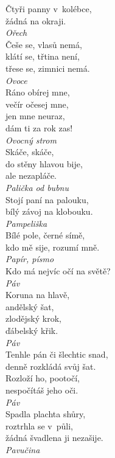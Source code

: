 \begin{multicols}{4}
\noindent
Čtyři panny v~kolébce,\\
žádná na okraji.\\[1 mm]
{\sl Ořech}\\

\noindent
Češe se, vlasů nemá,\\
klátí se, třtina není,\\
třese se, zimnici nemá.\\[1 mm]
{\sl Ovoce}\\

\noindent
Ráno obírej mne,\\
večír očesej mne,\\
jen mne neuraz,\\
dám ti za rok zas!\\[1 mm]
{\sl Ovocný strom}\\

\noindent
Skáče, skáče,\\
do stěny hlavou bije,\\
ale nezapláče.\\[1 mm]
{\sl Palička od bubnu}\\

\noindent
Stojí paní na palouku,\\
bílý závoj na klobouku.\\[1 mm]
{\sl Pampeliška}\\

\noindent
Bílé pole, černé símě,\\
kdo mě sije, rozumí mně.\\[1 mm]
{\sl Papír, písmo}\\

\noindent
Kdo má nejvíc očí na světě?\\[1 mm]
{\sl Páv}\\

\noindent
Koruna na hlavě,\\
andělský šat,\\
zlodějský krok,\\
ďábelský křik.\\[1 mm]
{\sl Páv}\\

\noindent
Tenhle pán či šlechtic snad,\\
denně rozkládá svůj šat.\\
Rozloží ho, pootočí,\\
nespočítáš jeho oči.\\[1 mm]
{\sl Páv}\\

\noindent
Spadla plachta shůry,\\
roztrhla se v~půli,\\
žádná švadlena ji nezašije.\\[1 mm]
{\sl Pavučina}\\


\end{multicols}
